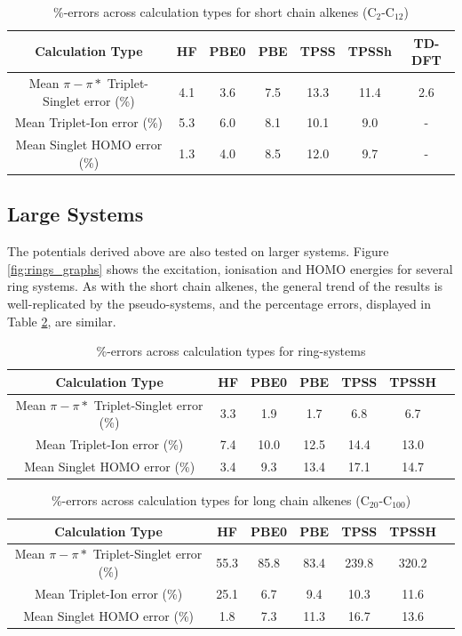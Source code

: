\documentclass[journal=jctcce,manuscript=article]{achemso}
\begin{document}
\begin{table}[h]
\caption{\%-errors across calculation types for short chain alkenes  (C\(_{2}\)-C\(_{12}\))}
\begin{tabular}{c c c c c c c}
\hline
Calculation Type & HF & PBE0 & PBE & TPSS & TPSSh & TD-DFT \\
\hline\hline
Mean \(\pi - \pi*\) Triplet-Singlet error (\%) & 4.1 & 3.6 & 7.5 & 13.3 & 11.4 & 2.6 \\
Mean Triplet-Ion error (\%) & 5.3 & 6.0 & 8.1 & 10.1 & 9.0 & - \\
Mean Singlet HOMO error (\%) & 1.3 & 4.0 & 8.5 & 12.0 & 9.7 & - \\
\hline
\end{tabular}
\label{table:alkene_errors}
\end{table}

\subsection{Large Systems}

The potentials derived above are also tested on larger systems. Figure \ref{fig:rings_graphs} shows the excitation, ionisation and HOMO energies for several ring systems. As with the short chain alkenes, the general trend of the results is well-replicated by the pseudo-systems, and the percentage errors, displayed in Table \ref{table:ring_system_errors}, are similar.

\begin{table}[h]
\caption{\%-errors across calculation types for ring-systems}
\begin{tabular}{c c c c c c c}
\hline
Calculation Type & HF & PBE0 & PBE & TPSS & TPSSH \\
\hline\hline
Mean \(\pi - \pi*\) Triplet-Singlet error (\%) & 3.3 & 1.9 & 1.7 & 6.8 & 6.7 \\
Mean Triplet-Ion error (\%) & 7.4 & 10.0 & 12.5 & 14.4 & 13.0 \\
Mean Singlet HOMO error (\%) & 3.4  & 9.3  & 13.4 & 17.1 & 14.7 \\
\hline
\end{tabular}
\label{table:ring_system_errors}
\end{table}

\begin{table}[h]
\caption{\%-errors across calculation types for long chain alkenes (C\(_{20}\)-C\(_{100}\))}
\begin{tabular}{c c c c c c c}
\hline\hline
Calculation Type & HF & PBE0 & PBE & TPSS & TPSSH \\
\hline
Mean \(\pi - \pi*\) Triplet-Singlet error (\%) & 55.3 & 85.8 & 83.4 & 239.8 & 320.2  \\
Mean Triplet-Ion error (\%) & 25.1 & 6.7 & 9.4 & 10.3 & 11.6 \\
Mean Singlet HOMO error (\%) & 1.8 & 7.3 & 11.3 & 16.7 & 13.6 \\
\hline
\end{tabular}
\label{table:long_alkene_errors}
\end{table}
\end{document}
